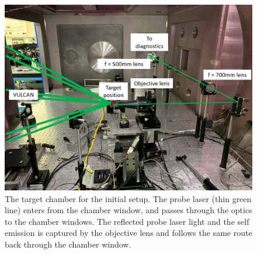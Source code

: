 \begin{figure}[ht]
\begin{centering}
\includegraphics[width=1.0\textwidth]{figures/AppendixExperiment/InitialChamber.png}%
\caption{\label{fig:Appx-InitialChamber} The target chamber for the initial setup. The probe laser (thin green line) enters from the chamber window, and passes through the optics to the chamber windows. The reflected probe laser light and the self emission is captured by the objective lens and follows the same route back through the chamber window.}
\end{centering}
\end{figure}

